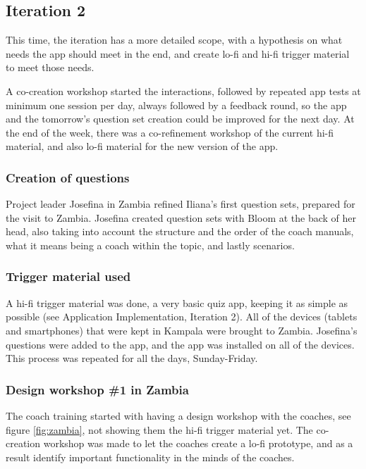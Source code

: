 \subsection{Iteration 2}

This time, the iteration has a more detailed scope, with a hypothesis on what needs the app should meet in the end, and create lo-fi and hi-fi trigger material to meet those needs.

A co-creation workshop started the interactions, followed by repeated app tests at minimum one session per day, always followed by a feedback round, so the app and the tomorrow's question set creation could be improved for the next day. At the end of the week, there was a co-refinement workshop of the current hi-fi material, and also lo-fi material for the new version of the app.

\subsubsection*{Creation of questions}
Project leader Josefina in Zambia refined Iliana's first question sets, prepared for the visit to Zambia. Josefina created question sets with Bloom at the back of her head, also taking into account the structure and the order of the coach manuals, what it means being a coach within the topic, and lastly scenarios.

\subsubsection{Trigger material used}
A hi-fi trigger material was done, a very basic quiz app, keeping it as simple as possible (see Application Implementation, Iteration 2). All of the devices (tablets and smartphones) that were kept in Kampala were brought to Zambia. Josefina's questions were added to the app, and the app was installed on all of the devices. This process was repeated for all the days, Sunday-Friday.

\subsubsection{Design workshop \#1 in Zambia}
The coach training started with having a design workshop with the coaches, see figure \ref{fig:zambia}, not showing them the hi-fi trigger material yet. The co-creation workshop was made to let the coaches create a lo-fi prototype, and as a result identify important functionality in the minds of the coaches.

